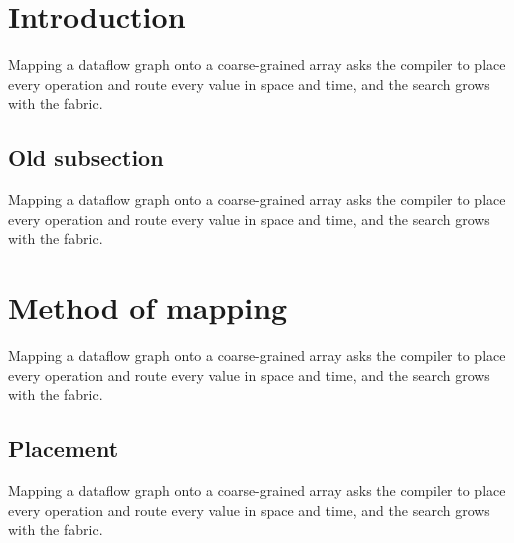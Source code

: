 \documentclass{article}
\begin{document}
\tableofcontents
\section{Introduction}
Mapping a dataflow graph onto a coarse-grained array asks the compiler to place every operation and route every value in space and time, and the search grows with the fabric.
\subsection{Old subsection}
Mapping a dataflow graph onto a coarse-grained array asks the compiler to place every operation and route every value in space and time, and the search grows with the fabric.
\section{Method of mapping}
Mapping a dataflow graph onto a coarse-grained array asks the compiler to place every operation and route every value in space and time, and the search grows with the fabric.
\subsection{Placement}
Mapping a dataflow graph onto a coarse-grained array asks the compiler to place every operation and route every value in space and time, and the search grows with the fabric.
\end{document}
